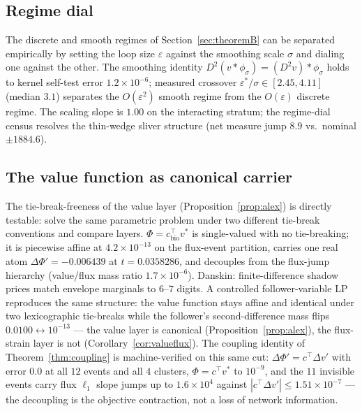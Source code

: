 \documentclass[11pt,a4paper]{article}
\theoremstyle{plain}
\theoremstyle{definition}
\theoremstyle{remark}
\begin{document}
\subsection{Regime dial}
\label{sec:m4}
The discrete and smooth regimes of Section~\ref{sec:theoremB} can be
separated empirically by setting the loop size $\varepsilon$ against
the smoothing scale $\sigma$ and dialing one against the other.
The smoothing identity $D^2(v * \phi_\sigma) = (D^2 v) * \phi_\sigma$
holds to kernel self-test error $1.2 \times 10^{-6}$; measured crossover
$\varepsilon^*/\sigma \in [2.45, 4.11]$ (median $3.1$) separates the
$O(\varepsilon^2)$ smooth regime from the $O(\varepsilon)$ discrete
regime. The scaling slope is $1.00$ on the interacting stratum; the regime-dial census resolves the thin-wedge sliver structure
(net measure jump $8.9$ vs.\ nominal $\pm 1884.6$).

\subsection{The value function as canonical carrier}
\label{sec:v1}
The tie-break-freeness of the value layer
(Proposition~\ref{prop:alex}) is directly testable: solve the same
parametric problem under two different tie-break conventions and
compare layers.
$\Phi = c_{\mathrm{bio}}^\top v^*$ is single-valued with no tie-breaking;
it is piecewise affine at $4.2 \times 10^{-13}$ on the flux-event
partition, carries one real atom
$\Delta\Phi' = -0.006439$ at $t = 0.0358286$, and decouples from the
flux-jump hierarchy (value/flux mass ratio $1.7 \times 10^{-6}$).
Danskin: finite-difference shadow prices match envelope marginals to
$6$--$7$ digits. A controlled follower-variable LP reproduces the same
structure: the value function stays affine and identical under two
lexicographic tie-breaks while the follower's second-difference mass
flips $0.0100 \leftrightarrow 10^{-13}$ --- the value layer is
canonical (Proposition~\ref{prop:alex}), the flux-strain layer is not
(Corollary~\ref{cor:valueflux}). The coupling identity of
Theorem~\ref{thm:coupling} is machine-verified on this same cut:
$\Delta\Phi' = c^\top \Delta v'$ with error $0.0$ at all $12$
events and all $4$ clusters, $\Phi = c^\top v^*$ to $10^{-9}$, and
the $11$ invisible events carry flux $\ell_1$ slope jumps up to
$1.6 \times 10^{4}$ against $|c^\top \Delta v'| \le 1.51 \times
10^{-7}$ --- the decoupling is the objective contraction, not a loss
of network information.

\end{document}
